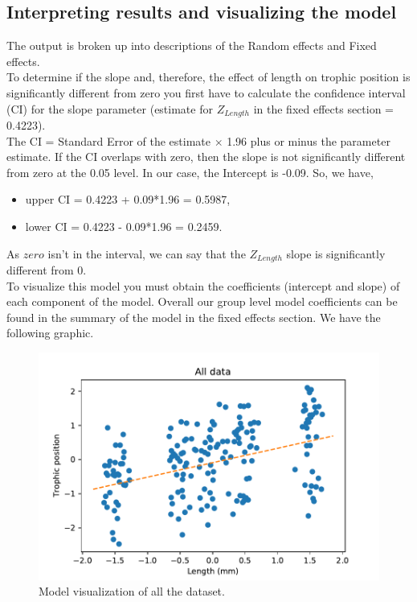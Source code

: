 \documentclass{article}
\begin{document}
\subsection{Interpreting results and visualizing the model}
The output is broken up into descriptions of the Random effects and Fixed effects. \\
To determine if the slope and, therefore, the effect of length on trophic position is significantly different from zero you first have to calculate the confidence interval (CI) for the slope parameter (estimate for $Z_{Length}$ in the fixed effects section = 0.4223).\\
The CI = Standard Error of the estimate $\times$ 1.96 plus or minus the parameter estimate. If the CI overlaps with zero, then the slope is not significantly different from zero at the 0.05 level. In our case, the Intercept is -0.09. So, we have, 
\begin{itemize}
    \item upper CI = 0.4223 + 0.09*1.96 = 0.5987,
    \item lower CI = 0.4223 - 0.09*1.96 = 0.2459.
\end{itemize}

As $zero$ isn't in the interval, we can say that the $Z_{Length}$ slope is significantly different from 0.\\
To visualize this model you must obtain the coefficients (intercept and slope) of each component of the model. Overall our group level model coefficients can be found in the summary of the model in the fixed effects section.
We have the following graphic. 
\begin{figure}[h!]
    \centering
    \includegraphics[scale=0.7]{images/Model_visual_all_data.pdf}
    \caption{Model visualization of all the dataset.}
    \label{all_data}
\end{figure}
\end{document}
